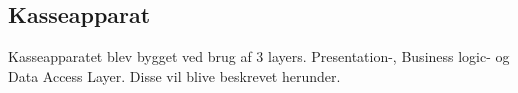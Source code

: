 \subsection{Kasseapparat}

Kasseapparatet blev bygget ved brug af 3 layers. Presentation-, Business logic- og Data Access Layer. Disse vil blive beskrevet herunder.





